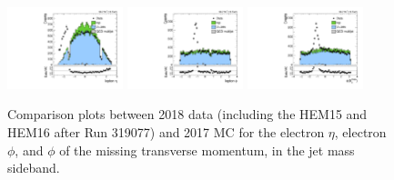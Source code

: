 \begin{figure}[htbp]
  \centering
  \includegraphics[width=0.30\textwidth]{fig/controlPlots/SB_e_2018_lnujj_l1_l_eta.pdf}
  \includegraphics[width=0.30\textwidth]{fig/controlPlots/SB_e_2018_lnujj_l1_l_phi.pdf}
  \includegraphics[width=0.30\textwidth]{fig/controlPlots/SB_e_2018_met_phi.pdf}
  \caption{
    Comparison plots between 2018 data (including the HEM15 and HEM16 after Run 319077) and 2017 MC for the electron $\eta$, electron $\phi$, and $\phi$ of the missing transverse momentum, in the jet mass sideband.
  }
  \label{fig:SB_controlPlots2018_electronexcess}
\end{figure}
